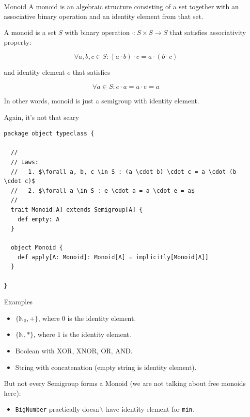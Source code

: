 \documentclass[presentation,aspectratio=169,smaller]{beamer}
\begin{document}
\begin{frame}[label={sec:orgb9f5880}]{Monoid}
A monoid is an algebraic structure consisting of a set together with an
associative binary operation and an identity element from that set.

\pause

A monoid is a set \(S\) with binary operation \(\cdot : S \times S \rightarrow
S\) that satisfies associativity property:

$$\forall a, b, c \in S : (a \cdot b) \cdot c = a \cdot (b \cdot c)$$

and identity element \(e\) that satisfies

$$\forall a \in S : e \cdot a = a \cdot e = a$$

\pause

In other words, monoid is just a semigroup with identity element.
\end{frame}

\begin{frame}[label={sec:org61fc4bf},fragile]{Again, it's not that scary}
 \begin{verbatim}
package object typeclass {

  //
  // Laws:
  //   1. $\forall a, b, c \in S : (a \cdot b) \cdot c = a \cdot (b \cdot c)$
  //   2. $\forall a \in S : e \cdot a = a \cdot e = a$
  //
  trait Monoid[A] extends Semigroup[A] {
    def empty: A
  }

  object Monoid {
    def apply[A: Monoid]: Monoid[A] = implicitly[Monoid[A]]
  }

}
\end{verbatim}
\end{frame}

\begin{frame}[label={sec:org2ab047f},fragile]{Examples}
 \begin{itemize}
\item \(\{\mathbb{N}_0, +\}\), where \(0\) is the identity element.
\item \(\{\mathbb{N}, *\}\), where \(1\) is the identity element.
\item Boolean with XOR, XNOR, OR, AND.
\item String with concatenation (empty string is identity element).
\end{itemize}

But not every Semigroup forms a Monoid (we are not talking about free monoids
here):

\begin{itemize}
\item \texttt{BigNumber} practically doesn’t have identity element for \texttt{min}.
\end{itemize}
\end{frame}
\end{document}
